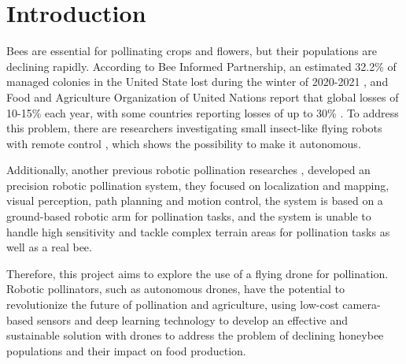 \section{Introduction}
Bees are essential for pollinating crops and flowers, but their populations are declining rapidly. According to Bee Informed Partnership, an estimated 32.2\% of managed colonies in the United State lost during the winter of 2020-2021 \cite{b1}, and Food and Agriculture Organization of United Nations report that global losses of 10-15\% each year, with some countries reporting losses of up to 30\% \cite{b2}. To address this problem, there are researchers investigating small insect-like flying robots with remote control \cite{b3}, which shows the possibility to make it autonomous.

Additionally, another previous robotic pollination researches \cite{b4}, developed an precision robotic pollination system, they focused on localization and mapping, visual perception, path planning and motion control, the system is based on a ground-based robotic arm for pollination tasks, and the system is unable to handle high sensitivity and tackle complex terrain areas for pollination tasks as well as a real bee.

Therefore, this project aims to explore the use of a flying drone for pollination. Robotic pollinators, such as autonomous drones, have the potential to revolutionize the future of pollination and agriculture, using low-cost camera-based sensors and deep learning technology to develop an effective and sustainable solution with drones to address the problem of declining honeybee populations and their impact on food production.
